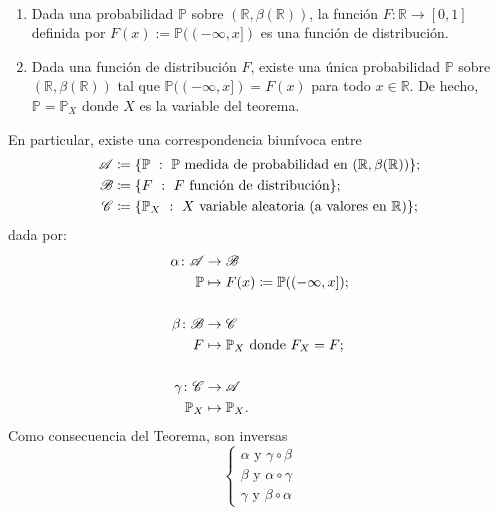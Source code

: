\begin{corollary}~
    \begin{enumerate}
        \item Dada una probabilidad \(\mathbb{P}\) sobre \((\mathbb{R}, \beta(\mathbb{R}))\), la función \(F: \mathbb{R} \to [0,1]\) definida por \(F(x) := \mathbb{P}((-\infty, x])\) es una función de distribución.

        \item Dada una función de distribución \(F\), existe una única probabilidad \(\mathbb{P}\) sobre \((\mathbb{R}, \beta(\mathbb{R}))\) tal que \(\mathbb{P}((-\infty, x]) = F(x)\) para todo \(x \in \mathbb{R}\). De hecho, \(\mathbb{P} = \mathbb{P}_X\) donde \(X\) es la variable del teorema.
    \end{enumerate}
\end{corollary}
\medskip \par
En particular, existe una correspondencia biunívoca entre
\begin{align*}
	\mathscr{A} &\coloneq \{\mathbb{P} \ : \ \mathbb{P} \text{ medida de probabilidad en } (\mathbb{R}, \beta(\mathbb{R}))\}; \\
	\mathscr{B} &\coloneq \{F \ : \ F \text{ función de distribución}\}; \\
	\mathscr{C} &\coloneq \{\mathbb{P}_{X} \ : \ X \text{ variable aleatoria (a valores en $\mathbb{R}$)}\};  
\end{align*}
dada por:
\begin{align*}
	\alpha \colon \mathscr{A} &\to \mathscr{B} \\
	\mathbb{P} &\mapsto F(x) \coloneq \mathbb{P}((-\infty, x]); \\
	& \\
	\beta \colon \mathscr{B} &\to \mathscr{C} \\
	F &\mapsto \mathbb{P}_{X} \text{ donde } F_{X} = F; \\
	& \\
	\gamma \colon \mathscr{C} &\to \mathscr{A} \\
	\mathbb{P}_{X} &\mapsto \mathbb{P}_{X}
.\end{align*}
Como consecuencia del Teorema, son inversas
\[ \begin{cases}
	\alpha \text { y } \gamma \circ \beta \\
	\beta \text{ y } \alpha \circ \gamma \\
	\gamma \text{ y } \beta \circ \alpha
\end{cases} \]

